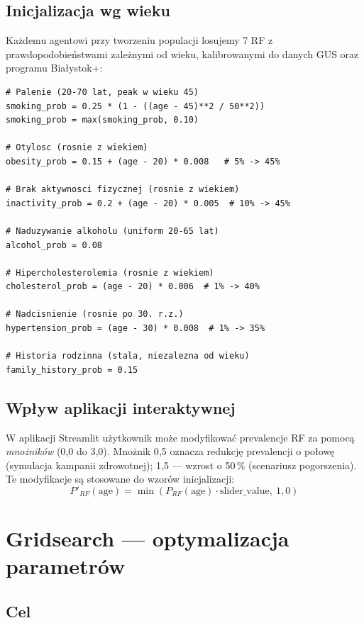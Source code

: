 \documentclass[11pt,a4paper]{article}
\begin{document}
\subsection{Inicjalizacja wg wieku}

Każdemu agentowi przy tworzeniu populacji losujemy 7 RF z prawdopodobieństwami zależnymi od wieku, kalibrowanymi do danych GUS oraz programu Białystok+:

\begin{lstlisting}
# Palenie (20-70 lat, peak w wieku 45)
smoking_prob = 0.25 * (1 - ((age - 45)**2 / 50**2))
smoking_prob = max(smoking_prob, 0.10)

# Otylosc (rosnie z wiekiem)
obesity_prob = 0.15 + (age - 20) * 0.008   # 5% -> 45%

# Brak aktywnosci fizycznej (rosnie z wiekiem)
inactivity_prob = 0.2 + (age - 20) * 0.005  # 10% -> 45%

# Naduzywanie alkoholu (uniform 20-65 lat)
alcohol_prob = 0.08

# Hipercholesterolemia (rosnie z wiekiem)
cholesterol_prob = (age - 20) * 0.006  # 1% -> 40%

# Nadcisnienie (rosnie po 30. r.z.)
hypertension_prob = (age - 30) * 0.008  # 1% -> 35%

# Historia rodzinna (stala, niezalezna od wieku)
family_history_prob = 0.15
\end{lstlisting}

\subsection{Wpływ aplikacji interaktywnej}

W aplikacji Streamlit użytkownik może modyfikować prevalencje RF za pomocą \emph{mnożników} (0{,}0 do 3{,}0). Mnożnik 0{,}5 oznacza redukcję prevalencji o połowę (symulacja kampanii zdrowotnej); 1{,}5 --- wzrost o 50\,\% (scenariusz pogorszenia). Te modyfikacje są stosowane do wzorów inicjalizacji:
\[
P'_{RF}(\text{age}) = \min(P_{RF}(\text{age}) \cdot \text{slider\_value},\ 1{,}0)
\]

\newpage
\section{Gridsearch --- optymalizacja parametrów}
\label{sec:gridsearch}

\subsection{Cel}
\end{document}
